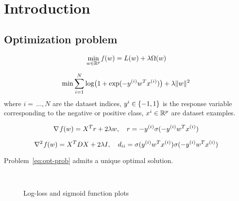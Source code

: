 \section{Introduction}\label{sc:intro}


\subsection{Optimization problem}

\[
\min_{w\in\mathbb{R}^p}\operatorname*{\mathit{f}}(w)=L(w)+\lambda\Omega(w)
\]

\begin{equation}\label{eq:opt-prob}
\min\sum_{i=1}^N\log\bigl(1+\exp(-y^{(i)}w^Tx^{(i)})\bigr)+\lambda\lVert w\rVert^2
\end{equation}
where $i=\,\dots,N$ are the dataset indices, $y^{i}\in\{-1,1\}$ is the response variable corresponding to the negative or positive class, $x^{i}\in\mathbb{R}^p$ are dataset examples.

\[
\nabla\operatorname*{\mathit{f}}(w)=X^Tr+2\lambda w,\quad r=-y^{(i)}\sigma(-y^{(i)}w^Tx^{(i)})
\]

\[
\nabla^2\operatorname*{\mathit{f}}(w)=X^TDX+2\lambda I,\quad d_{ii}=\sigma(y^{(i)}w^Tx^{(i)})\sigma(-y^{(i)}w^Tx^{(i)})
\]

\begin{prop}
Problem~\eqref{eq:opt-prob} admits a unique optimal solution.
\end{prop}

\cleardoublepage


\begin{figure}
\centering
{} \\
\caption{Log-loss and sigmoid function plots}
\label{fig:log-sigma}
\end{figure}

